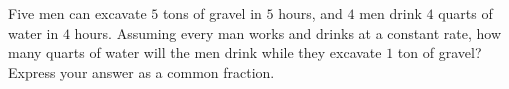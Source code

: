 Five men can excavate $5$ tons of gravel in $5$ hours, and $4$ men drink $4$ quarts of water in $4$ hours. Assuming every man works and drinks at a constant rate, how many quarts of water will the men drink while they excavate $1$ ton of gravel? Express your answer as a common fraction.
